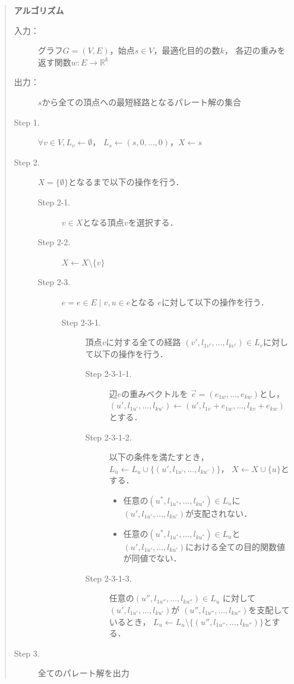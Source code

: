 \documentclass[12pt]{optlab-bachelor}
\begin{document}
\begin{quote}
  \textbf{アルゴリズム}
  \begin{description}
    \item[入力：] グラフ$G=(V,E)$，始点$s \in V$，最適化目的の数$k$，
    各辺の重みを返す関数$w : E \to \mathbb{R}^k$
    \item[出力：] $s$から全ての頂点への最短経路となるパレート解の集合
    \item[Step 1.] $\forall v \in V , L_v \leftarrow \emptyset$，
    $L_s \leftarrow (s,0,\ldots,0)$，$X \leftarrow s$
    \item[Step 2.] $X = \{\emptyset\}$となるまで以下の操作を行う．
    \begin{description}
      \item[Step 2-1.] $v \in X$となる頂点$v$を選択する．
      \item[Step 2-2.] $X \leftarrow X \setminus \{ v \}$
      \item[Step 2-3.] $e = {e \in E \mid v,u \in e}$となる
      $e$に対して以下の操作を行う．
      \begin{description}
        \item[Step 2-3-1.] 頂点$v$に対する全ての経路
        $(v',l_{1v'},\ldots,l_{kv'}) \in L_v$に対して以下の操作を行う．
        \begin{description}
          \item[Step 2-3-1-1.] 辺$e$の重みベクトルを
          $\vec{e} = (e_{1w},\ldots,e_{kw})$とし，
          $(u',l_{1u'},\ldots,l_{ku'}) \leftarrow
          (u',l_{1v}+e_{1w},\ldots,l_{kv}+e_{kw})$とする．
          \item[Step 2-3-1-2.] 以下の条件を満たすとき，
          $L_u \leftarrow L_u \cup \{(u',l_{1u'},\ldots,l_{ku'})\}$，
          $X \leftarrow X \cup \{ u\}$とする．
          \begin{itemize}
            \item 任意の$(u^*,l_{1u^*},\ldots,l_{ku^*})\in L_u$に
            $(u',l_{1u'},\ldots,l_{ku'})$が支配されない．
            \item 任意の$(u^*,l_{1u^*},\ldots,l_{ku^*}) \in L_u$と
            $(u',l_{1u'},\ldots,l_{ku'})$における全ての目的関数値が同値でない．
          \end{itemize}
          \item[Step 2-3-1-3.] 任意の$(u'',l_{1u''},\ldots,l_{ku''})\in L_u$
          に対して$(u',l_{1u'},\ldots,l_{ku'})$が
          $(u'',l_{1u''},\ldots,l_{ku''})$を支配しているとき，
          $L_u \leftarrow L_u \setminus \{(u'',l_{1u''},\ldots,l_{ku''})\}$とする．
        \end{description}
      \end{description}
    \end{description}
    \item[Step 3.] 全てのパレート解を出力
  \end{description}
\end{quote}
\end{document}
